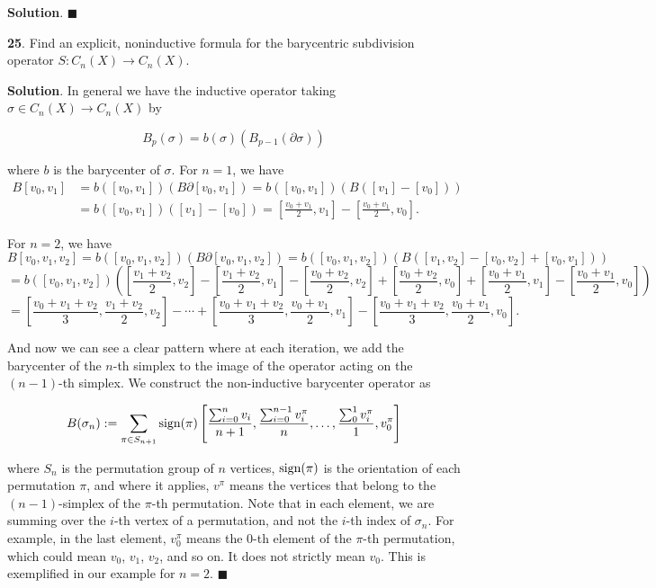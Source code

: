 \documentclass{article}
\begin{document}
\textbf{Solution}. $\blacksquare$
\bigskip
\bigskip

\textbf{25}. Find an explicit, noninductive formula for the barycentric subdivision operator $S:C_{n}(X)\to C_{n}(X)$.
\medskip

\textbf{Solution}. In general we have the inductive operator taking $\sigma\in C_{n}(X)\to C_{n}(X)$ by

$$B_{p}(\sigma) = b(\sigma)\left(B_{p-1}(\partial\sigma)\right)$$

where $b$ is the barycenter of $\sigma$. For $n = 1$, we have
\begin{align*}
B[v_{0}, v_{1}] &= b([v_{0}, v_{1}])(B\partial [v_{0}, v_{1}]) = b([v_{0}, v_{1}])(B([v_{1}]-[v_{0}]))\\ &= b([v_{0}, v_{1}])([v_{1}]-[v_{0}]) = \left[\frac{v_{0}+v_{1}}{2}, v_{1}\right] - \left[\frac{v_{0}+v_{1}}{2}, v_{0}\right].
\end{align*}

For $n = 2$, we have
$$B[v_{0}, v_{1}, v_{2}] = b([v_{0}, v_{1}, v_{2}])(B\partial [v_{0}, v_{1}, v_{2}]) = b([v_{0}, v_{1}, v_{2}])(B([v_{1}, v_{2}]-[v_{0}, v_{2}] + [v_{0}, v_{1}]))$$
$$= b([v_{0}, v_{1}, v_{2}])\left(\left[\frac{v_{1}+v_{2}}{2}, v_{2}\right] - \left[\frac{v_{1}+v_{2}}{2}, v_{1}\right] - \left[\frac{v_{0}+v_{2}}{2}, v_{2}\right] + \left[\frac{v_{0}+v_{2}}{2}, v_{0}\right] + \left[\frac{v_{0}+v_{1}}{2}, v_{1}\right] - \left[\frac{v_{0}+v_{1}}{2}, v_{0}\right]\right)$$
$$= \left[\frac{v_{0}+v_{1}+v_{2}}{3},\frac{v_{1}+v_{2}}{2}, v_{2}\right] - \cdots + \left[\frac{v_{0}+v_{1}+v_{2}}{3}, \frac{v_{0}+v_{1}}{2}, v_{1}\right] - \left[\frac{v_{0}+v_{1}+v_{2}}{3}, \frac{v_{0}+v_{1}}{2}, v_{0}\right].$$

And now we can see a clear pattern where at each iteration, we add the barycenter of the $n$-th simplex to the image of the operator acting on the $(n-1)$-th simplex. We construct the non-inductive barycenter operator as 

$$B(\sigma_{n}) := \sum_{\pi \in S_{n+1}} \textnormal{sign}(\pi) \left[\frac{\sum_{i=0}^{n} v_{i}}{n+1}, \frac{\sum_{i=0}^{n-1} v^{\pi}_{i}}{n}, \ldots, \frac{\sum_{0}^{1} v^{\pi}_{i}}{1}, v^{\pi}_{0}\right]$$

where $S_{n}$ is the permutation group of $n$ vertices, $\textnormal{sign}(\pi)$ is the orientation of each permutation $\pi$, and where it applies, $v^{\pi}$ means the vertices that belong to the $(n-1)$-simplex of the $\pi$-th permutation. Note that in each element, we are summing over the $i$-th vertex of a permutation, and not the $i$-th index of $\sigma_{n}$. For example, in the last element, $v^{\pi}_{0}$ means the 0-th element of the $\pi$-th permutation, which could mean $v_{0}$, $v_{1}$, $v_{2}$, and so on. It does not strictly mean $v_{0}$. This is exemplified in our example for $n = 2$. $\blacksquare$
\bigskip
\bigskip
\end{document}
